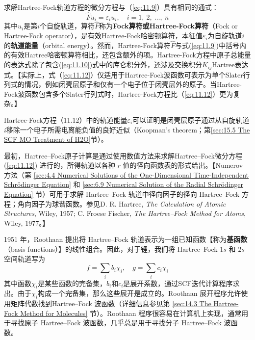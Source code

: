     求解Hartree-Fock轨道方程的微分方程与（\ref{eq:11.9}）具有相同的通式：
    \begin{equation}
        \hat{F} u_i = \varepsilon_i u_i, \quad i = 1, \: 2, \: \ldots, \: n
        \label{eq:11.12}
    \end{equation}
    其中$u_i$是第$i$个自旋轨道，算符$\hat{F}$称为\textbf{Fock算符或Hartree-Fock算符}（Fock or Hartree-Fock operator），是有效Hartree-Fock哈密顿算符，本征值$\varepsilon_i$为自旋轨道$i$的\textbf{轨道能量}（orbital energy）。然而，Hartree-Fock算符$\hat{F}$与式(\ref{eq:11.9})中括号内的有效Hartree哈密顿算符相比，还包含额外的项。Hartree-Fock方程中原子总能量的表达式除了包含(\ref{eq:11.10})式中的库仑积分外，还涉及交换积分$K_{ij}$Hartree表达式。【实际上，式（\ref{eq:11.12}）仅适用于Hartree-Fock波函数可表示为单个Slater行列式的情况，例如闭壳层原子和仅有一个电子位于闭壳层外的原子。当Hartree-Fock波函数包含多个Slater行列式时，Hartree-Fock方程比（\ref{eq:11.12}）更为复杂。】

    Hartree-Fock方程（11.12）中的轨道能量$\varepsilon_i$可以证明是闭壳层原子通过从自旋轨道$i$移除一个电子所需电离能负值的良好近似（Koopman's theorem；第\ref{sec:15.5 The SCF MO Treatment of H2O}节）。

    最初，Hartree–Fock原子计算是通过使用数值方法来求解Hartree–Fock微分方程 (\ref{eq:11.12}) 进行的，所得轨道以各种 $r$ 值的径向函数表的形式给出。【Numerov 方法（第 \ref{sec:4.4 Numerical Solutions of the One-Dimensional Time-Independent Schrödinger Equation} 和 \ref{sec:6.9 Numerical Solution of the Radial Schrödinger Equation} 节）可用于求解 Hartree–Fock 轨道中径向因子的径向 Hartree–Fock 方程；角向因子为球谐函数。参见D. R. Hartree, \textit{The Calculation of Atomic Structures}, Wiley, 1957; C. Froese Fischer, \textit{The Hartree–Fock Method for Atoms}, Wiley, 1977。】

    1951 年，Roothaan 提出将 Hartree–Fock 轨道表示为一组已知函数【称为\textbf{基函数}（basis functions）】的线性组合。因此，对于锂，我们将 Hartree–Fock $1s$ 和 $2s$ 空间轨道写为
    \begin{equation}
        f = \sum_i b_i \chi_i, \quad g = \sum_i c_i \chi_i
        \label{eq:11.13}
    \end{equation}
    其中函数$\chi_i$是某些函数的完备集，$b_i$和$c_i$是展开系数，通过SCF迭代计算程序求出。由于$\chi_i$构成一个完备集，那么这些展开是成立的。Roothaan 展开程序允许使用矩阵代数找到Hartree–Fock 波函数（详细信息参见第 \ref{sec:14.3 The Hartree-Fock Method for Molecules} 节）。Roothaan 程序很容易在计算机上实现，通常用于寻找原子 Hartree–Fock 波函数，几乎总是用于寻找分子 Hartree–Fock 波函数。


